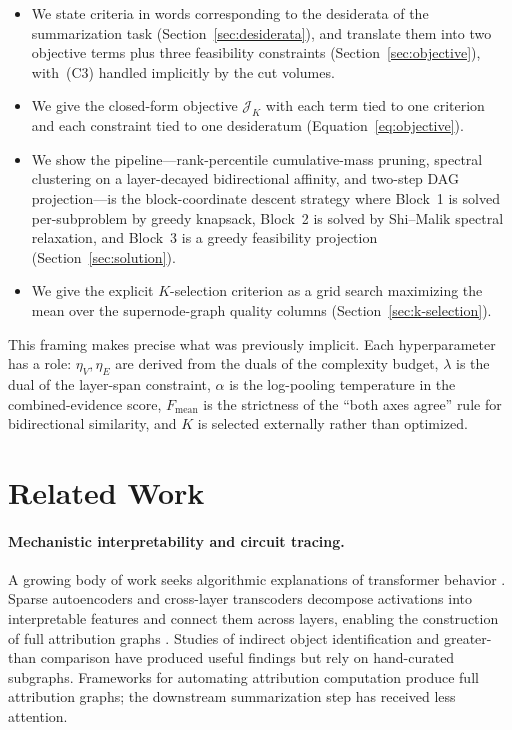 \documentclass[table, 11pt]{article}
\begin{document}
\begin{itemize}[leftmargin=*,topsep=2pt,itemsep=2pt]
\item We state criteria in words corresponding to the desiderata of
the summarization task (Section~\ref{sec:desiderata}), and translate
them into two objective terms plus three feasibility constraints
(Section~\ref{sec:objective}), with~(C3) handled implicitly by the
cut volumes.
\item We give the closed-form objective $\mathcal{J}_K$ with each
term tied to one criterion and each constraint tied to one
desideratum (Equation~\ref{eq:objective}).
\item We show the pipeline---rank-percentile cumulative-mass pruning,
spectral clustering on a layer-decayed bidirectional affinity, and
two-step DAG projection---is the block-coordinate descent strategy
where Block~1 is solved per-subproblem by greedy knapsack, Block~2
is solved by Shi--Malik spectral relaxation, and Block~3 is a
greedy feasibility projection (Section~\ref{sec:solution}).
\item We give the explicit $K$-selection criterion as a grid search
maximizing the mean over the supernode-graph quality columns
(Section~\ref{sec:k-selection}).
\end{itemize}

This framing makes precise what was previously implicit. Each
hyperparameter has a role: $\eta_V, \eta_E$ are derived from the
duals of the complexity budget, $\lambda$ is the dual of the
layer-span constraint, $\alpha$ is the log-pooling temperature in
the combined-evidence score, $F_{\text{mean}}$ is the strictness of
the ``both axes agree'' rule for bidirectional similarity, and $K$
is selected externally rather than optimized.

\section{Related Work}

\paragraph{Mechanistic interpretability and circuit tracing.}
A growing body of work seeks algorithmic explanations of transformer
behavior \cite{olah2020zoom, elhage2021mathematical}. Sparse
autoencoders \cite{cunningham2023sparse, bricken2023monosemanticity}
and cross-layer transcoders \cite{lindsey2024sparse} decompose
activations into interpretable features and connect them across
layers, enabling the construction of full attribution graphs
\cite{ameisen2024scaling}. Studies of indirect object identification
\cite{wang2022interpretability} and greater-than comparison
\cite{hanna2023does} have produced useful findings but rely on
hand-curated subgraphs. Frameworks for automating attribution
computation \cite{ameisen2024scaling} produce full attribution
graphs; the downstream summarization step has received less attention.
\end{document}
